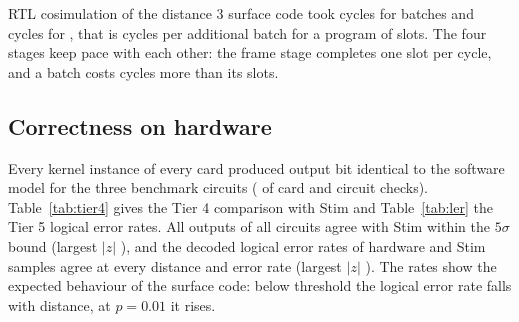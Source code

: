 \begin{table}[t]
\caption{Resources of the kernel. HLS: estimate for one instance, in percent of one SLR. Routed: one instance, and
all \NumInstancesPerCard{} instances of a card in percent of the resources available to user logic, from the post
route utilisation report.}\label{tab:resources}

\end{table}

RTL cosimulation of the distance 3 surface code took \NumCosimCyclesA{} cycles for \NumCosimBatchesA{} batches and
\NumCosimCyclesB{} cycles for \NumCosimBatchesB{}, that is \NumCosimPerBatch{} cycles per additional batch for a
program of \NumSlotsSurfThree{} slots. The four stages keep pace with each other: the frame stage completes one slot
per cycle, and a batch costs \NumCosimOverhead{} cycles more than its slots.

\subsection{Correctness on hardware}\label{sec:res-correct}

Every kernel instance of every card produced output bit identical to the software model for the three benchmark
circuits (\NumBenchCheckPassed{} of \NumBenchCheckTotal{} card and circuit checks). Table~\ref{tab:tier4} gives the
Tier 4 comparison with Stim and Table~\ref{tab:ler} the Tier 5 logical error rates. All outputs of all circuits agree
with Stim within the $5\sigma$ bound (largest $|z|$ \NumTierFourMaxZ{}), and the decoded logical error rates of
hardware and Stim samples agree at every distance and error rate (largest $|z|$ \NumTierFiveMaxZ{}). The rates show
the expected behaviour of the surface code: below threshold the logical error rate falls with distance, at
$p=0.01$ it rises.

\begin{table}[t]
\caption{Tier 4: detector and observable firing rates of hardware samples against Stim. The largest two proportion
$|z|$ over all outputs of a circuit is reported.}\label{tab:tier4}

\end{table}

\begin{table}[t]
\caption{Tier 5: logical error rates (LER) of rotated surface code memory experiments, hardware samples against Stim
samples, both decoded by the same PyMatching matcher.}\label{tab:ler}

\end{table}

